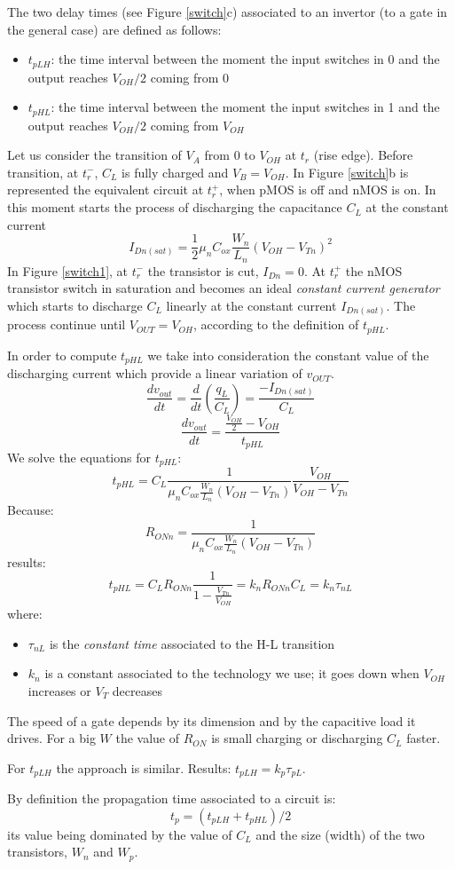 The two delay times (see Figure \ref{switch}c) associated to an invertor
(to a gate in the general case) are defined as follows:
\begin{itemize}
    \item $t_{pLH}$: the time interval between the moment the input
    switches in 0 and the output reaches $V_{OH}/2$ coming from 0
    \item $t_{pHL}$: the time interval between the moment the input
    switches in 1 and the output reaches $V_{OH}/2$ coming from $V_{OH}$
\end{itemize}

Let us consider the transition of $V_A$ from 0 to $V_{OH}$ at $t_r$ (rise edge). Before transition, at $t_r^-$, $C_L$ is fully charged and $V_B = V_{OH}$. In Figure \ref{switch}b is represented the equivalent circuit at $t_r^+$, when pMOS is off and nMOS is on. In this moment starts the process of discharging  the capacitance $C_L$ at the constant current
$$I_{Dn(sat)} = \frac{1}{2} \mu_n C_{ox} \frac{W_n}{L_n} (V_{OH} - V_{Tn})^2$$
In Figure \ref{switch1}, at $t_r^-$ the transistor is cut, $I_{Dn} = 0$. At $t_r^+$ the  nMOS transistor switch in saturation and becomes an ideal {\em constant current generator} which starts to discharge $C_L$ linearly at the constant current $I_{Dn(sat)}$. The process continue until $V_{OUT} = V_{OH}$, according to the definition of $t_{pHL}$.



In order to compute $t_{pHL}$ we take into consideration the constant value of the discharging current which provide a linear variation of $v_{OUT}$.
$$\frac{dv_{out}}{dt} = \frac{d}{dt}(\frac{q_L}{C_L}) = \frac{-I_{Dn(sat)}}{C_L}$$
$$\frac{dv_{out}}{dt} = \frac{\frac{V_{OH}}{2} - V_{OH}}{t_{pHL}}$$
We solve the equations for $t_{pHL}$:
$$t_{pHL} = C_L \frac{1}{\mu_n C_{ox} \frac{W_n}{L_n} (V_{OH} - V_{Tn})} \frac{V_{OH}}{V_{OH} - V_{Tn}}$$
Because:
$$R_{ONn} = \frac{1}{\mu_n C_{ox} \frac{W_n}{L_n} (V_{OH} - V_{Tn})}$$
results:
$$t_{pHL} = C_L R_{ONn} \frac{1}{1 - \frac{V_{Tn}}{V_{OH}}} = k_n R_{ONn} C_L = k_n \tau_{nL} $$
where:
\begin{itemize}
\item $\tau_{nL}$ is the {\em constant time} associated to the H-L transition
\item $k_n$ is a constant associated to the technology we use; it goes down when $V_{OH}$ increases or $V_T$ decreases
\end{itemize}

The speed of a gate depends by its dimension and by the capacitive load
it drives. For a big $W$ the value of $R_{ON}$ is small charging or
discharging $C_{L}$ faster.

For $t_{pLH}$ the approach is similar. Results: $t_{pLH} = k_p \tau_{pL}$.

By definition the propagation time associated to a circuit is: $$t_p = (t_{pLH} + t_{pHL})/2$$
its value being dominated by the value of $C_L$ and the size (width) of the two transistors, $W_n$ and $W_p$.

